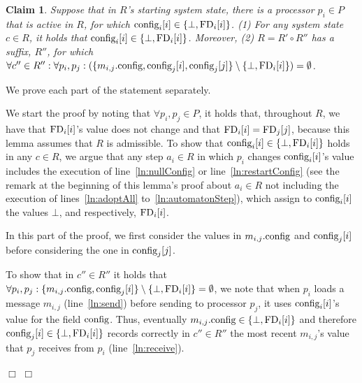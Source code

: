 \documentclass[11pt]{article}
\newtheorem{claim}[theorem]{Claim}
\newenvironment{proof}{\noindent{\bf Proof.}}{\hfill$\Box$}
\begin{document}
\begin{proof}
\begin{claim}
\label{thm:onceBot}
Suppose that in $R$'s starting system state, there is a processor $p_i \in P$ that is active in $R$, for which $\textnormal{config}_i[i]  \in \{ \bot, \textnormal{FD}_i[i] \}$. (1) For any system state $c \in R$, it holds that $\textnormal{config}_i[i] \in \{ \bot, \textnormal{FD}_i[i] \}$. Moreover, (2) $R=R'\circ R''$ has a suffix, $R''$, for which $\forall c'' \in R'':\forall p_i, p_j : (\{ m_{i,j}.\textnormal{config}, \textnormal{config}_j[i], \textnormal{config}_j[j] \} \setminus \{ \bot, \textnormal{FD}_i[i] \}) = \emptyset$.
\end{claim} 


\begin{proof}
We prove each part of the statement separately. 

We start the proof by noting that $\forall p_i, p_j \in P$, it holds that, throughout $R$, we have that $\textnormal{FD}_i[i]$'s value does not change and that $\textnormal{FD}_i[i] = \textnormal{FD}_j[j]$, because this lemma assumes that $R$ is admissible.
To show that $\textnormal{config}_i[i] \in \{ \bot, \textnormal{FD}_i[i] \}$ holds in any $c \in R$, we argue that any step $a_i \in R$ in which $p_i$ changes $\textnormal{config}_i[i]$'s value includes the execution of line~\ref{ln:nullConfig} or line~\ref{ln:restartConfig} (see the remark at the beginning of this lemma's proof about $a_i \in R$ not including the execution of lines~\ref{ln:adoptAll} to~\ref{ln:automatonStep}), which assign to $\textnormal{config}_i[i]$ the values $\bot$, and respectively, $\textnormal{FD}_i[i]$. 

 In this part of the proof, we first consider the values in $m_{i,j}.\textnormal{config}$ and $\textnormal{config}_j[i]$ before considering the one in $\textnormal{config}_j[j]$.

To show that in $c'' \in R''$ it holds that $\forall p_i, p_j : \{ m_{i,j}.\textnormal{config}, \textnormal{config}_j[i]  \} \setminus \{ \bot, \textnormal{FD}_i[i] \} = \emptyset$, we note that when $p_i$ loads a message $m_{i,j}$ (line~\ref{ln:send}) before sending to processor $p_j$, it uses $\textnormal{config}_i[i]$'s value for the field $\textnormal{config}$. Thus, eventually $m_{i,j}.\textnormal{config}  \in \{ \bot, \textnormal{FD}_i[i] \}$ and therefore $\textnormal{config}_j[i] \in \{ \bot, \textnormal{FD}_i[i] \}$ records correctly in $c'' \in R''$ the most recent $m_{i,j}$'s value that $p_j$ receives from $p_i$ (line~\ref{ln:receive}).


\end{proof}
\end{proof}
\end{document}

